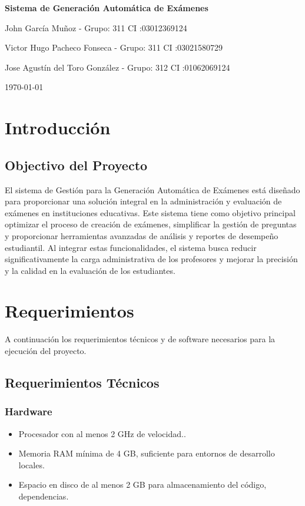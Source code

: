 \documentclass[a4paper,12pt]{article}
\begin{document}
\begin{titlepage}
    \centering
    \vspace{1in}
    {\Huge \bfseries Sistema de Generación Automática de Exámenes \par}
    \vspace{1.5in}
    {\Large John García Muñoz - Grupo: 311 CI :03012369124  \par}
    {\Large Victor Hugo Pacheco Fonseca - Grupo: 311 CI :03021580729 \par}
    {\Large Jose Agustín del Toro González - Grupo: 312 CI :01062069124 \par}
    \vfill
    {\Large \today \par}
\end{titlepage}

\tableofcontents
\newpage

\section{Introducción}

\subsection{Objectivo del Proyecto}
El sistema de Gestión para la Generación Automática de Exámenes está diseñado para proporcionar una solución integral en la administración y evaluación de exámenes en instituciones educativas. Este sistema tiene como objetivo principal optimizar el proceso de creación de exámenes, simplificar la gestión de preguntas y proporcionar herramientas avanzadas de análisis y reportes de desempeño estudiantil. Al integrar estas funcionalidades, el sistema busca reducir significativamente la carga administrativa de los profesores y mejorar la precisión y la calidad en la evaluación de los estudiantes.


\newpage
\section{Requerimientos}
A continuación los requerimientos técnicos y de software necesarios para la ejecución del proyecto.

\subsection{Requerimientos Técnicos}
\subsubsection{Hardware}
\begin{itemize}
	\item Procesador con al menos 2 GHz de velocidad..
	\item Memoria RAM mínima de 4 GB, suficiente para entornos de desarrollo
	locales.
	\item Espacio en disco de al menos 2 GB para almacenamiento del código,
	dependencias.
\end{itemize}
\end{document}
